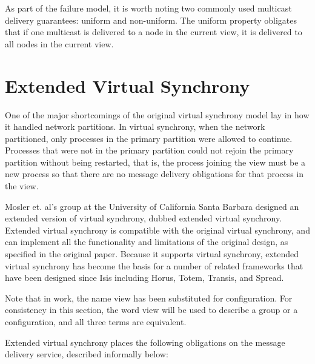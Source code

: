 As part of the failure model, it is worth noting two commonly used multicast
delivery guarantees: uniform and non-uniform. The uniform property obligates that
if one multicast is delivered to a node in the current view, it is delivered to
all nodes in the current view.

\section{Extended Virtual Synchrony}

One of the major shortcomings of the original virtual synchrony model lay in
how it handled network partitions. In virtual synchrony, when the network
partitioned, only processes in the primary partition were allowed to continue.
Processes that were not in the primary partition could not rejoin the primary
partition without being restarted, that is, the process joining the view must
be a new process so that there are no message delivery obligations for that
process in the view.

Mosler et. al's group at the University of California Santa Barbara\cite{EXTENDEDVIRTUALSYNCHRONY} designed
an extended version of virtual synchrony, dubbed extended virtual synchrony.
Extended virtual synchrony is compatible with the original virtual synchrony,
and can implement all the functionality and limitations of the original design,
as specified in the original paper. Because it supports virtual synchrony,
extended virtual synchrony has become the basis for a number of related
frameworks that have been designed since Isis including Horus, Totem, Transis,
and Spread.

Note that in \cite{EXTENDEDVIRTUALSYNCHRONY} work, the name view has been substituted for configuration.
For consistency in this section, the word view will be used to describe a group
or a configuration, and all three terms are equivalent.

Extended virtual synchrony places the following obligations on the message
delivery service, described informally below:

